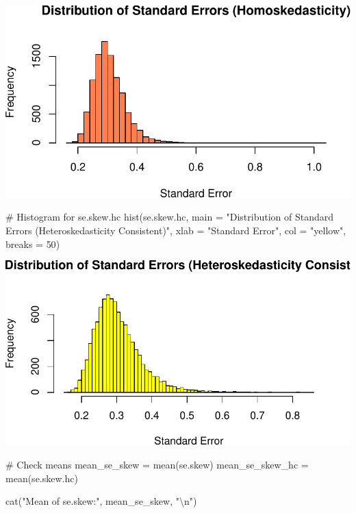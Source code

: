 \documentclass[
  11pt,
]{article}
\newenvironment{Shaded}{\begin{snugshade}}{\end{snugshade}}
\newcommand{\AttributeTok}[1]{\textcolor[rgb]{0.40,0.45,0.13}{#1}}
\newcommand{\CommentTok}[1]{\textcolor[rgb]{0.37,0.37,0.37}{#1}}
\newcommand{\DecValTok}[1]{\textcolor[rgb]{0.68,0.00,0.00}{#1}}
\newcommand{\FunctionTok}[1]{\textcolor[rgb]{0.28,0.35,0.67}{#1}}
\newcommand{\NormalTok}[1]{\textcolor[rgb]{0.00,0.23,0.31}{#1}}
\newcommand{\OtherTok}[1]{\textcolor[rgb]{0.00,0.23,0.31}{#1}}
\newcommand{\SpecialCharTok}[1]{\textcolor[rgb]{0.37,0.37,0.37}{#1}}
\newcommand{\StringTok}[1]{\textcolor[rgb]{0.13,0.47,0.30}{#1}}
\begin{document}
\includegraphics{HW-4-CODE-and-ANSWERS_files/figure-pdf/unnamed-chunk-13-1.pdf}

\begin{Shaded}
\begin{Highlighting}[]
\CommentTok{\# Histogram for se.skew.hc}
\FunctionTok{hist}\NormalTok{(se.skew.hc, }
     \AttributeTok{main =} \StringTok{"Distribution of Standard Errors (Heteroskedasticity Consistent)"}\NormalTok{,}
     \AttributeTok{xlab =} \StringTok{"Standard Error"}\NormalTok{, }\AttributeTok{col =} \StringTok{"yellow"}\NormalTok{, }\AttributeTok{breaks =} \DecValTok{50}\NormalTok{)}
\end{Highlighting}
\end{Shaded}

\includegraphics{HW-4-CODE-and-ANSWERS_files/figure-pdf/unnamed-chunk-13-2.pdf}

\begin{Shaded}
\begin{Highlighting}[]
\CommentTok{\# Check means}
\NormalTok{mean\_se\_skew }\OtherTok{=} \FunctionTok{mean}\NormalTok{(se.skew)}
\NormalTok{mean\_se\_skew\_hc }\OtherTok{=} \FunctionTok{mean}\NormalTok{(se.skew.hc)}

\FunctionTok{cat}\NormalTok{(}\StringTok{"Mean of se.skew:"}\NormalTok{, mean\_se\_skew, }\StringTok{"}\SpecialCharTok{\textbackslash{}n}\StringTok{"}\NormalTok{)}
\end{Highlighting}
\end{Shaded}
\end{document}
